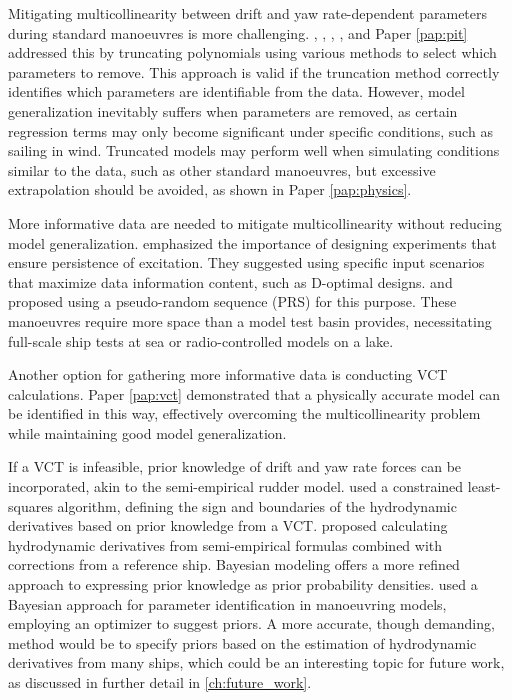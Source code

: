 Mitigating multicollinearity between drift and yaw rate-dependent parameters during standard manoeuvres is more challenging. \textcite{abkowitzMEASUREMENTHYDRODYNAMICCHARACTERISTICS1980}, \textcite{luoParameterIdentificationShip2016}, \textcite{xuUncertaintyAnalysisHydrodynamic2019}, \textcite{liuPhysicsinformedIdentificationMarine2024}, and Paper \ref{pap:pit} addressed this by truncating polynomials using various methods to select which parameters to remove. This approach is valid if the truncation method correctly identifies which parameters are identifiable from the data. However, model generalization inevitably suffers when parameters are removed, as certain regression terms may only become significant under specific conditions, such as sailing in wind. Truncated models may perform well when simulating conditions similar to the data, such as other standard manoeuvres, but excessive extrapolation should be avoided, as shown in Paper \ref{pap:physics}.

More informative data are needed to mitigate multicollinearity without reducing model generalization. \textcite{yoonIdentificationHydrodynamicCoefficients2003} emphasized the importance of designing experiments that ensure persistence of excitation. They suggested using specific input scenarios that maximize data information content, such as D-optimal designs. \textcite{wangOptimalDesignExcitation2020} and \textcite{millerShipModelIdentification2021} proposed using a pseudo-random sequence (PRS) for this purpose. These manoeuvres require more space than a model test basin provides, necessitating full-scale ship tests at sea or radio-controlled models on a lake.

Another option for gathering more informative data is conducting VCT calculations. Paper \ref{pap:vct} demonstrated that a physically accurate model can be identified in this way, effectively overcoming the multicollinearity problem while maintaining good model generalization.

If a VCT is infeasible, prior knowledge of drift and yaw rate forces can be incorporated, akin to the semi-empirical rudder model. \textcite{chillcceDatadrivenSystemIdentification2023} used a constrained least-squares algorithm, defining the sign and boundaries of the hydrodynamic derivatives based on prior knowledge from a VCT. \textcite{taimuri6DoFManeuveringModel2020} proposed calculating hydrodynamic derivatives from semi-empirical formulas combined with corrections from a reference ship. Bayesian modeling offers a more refined approach to expressing prior knowledge as prior probability densities. \textcite{xueHydrodynamicParameterIdentification2020} used a Bayesian approach for parameter identification in manoeuvring models, employing an optimizer to suggest priors. A more accurate, though demanding, method would be to specify priors based on the estimation of hydrodynamic derivatives from many ships, which could be an interesting topic for future work, as discussed in further detail in \autoref{ch:future_work}.
